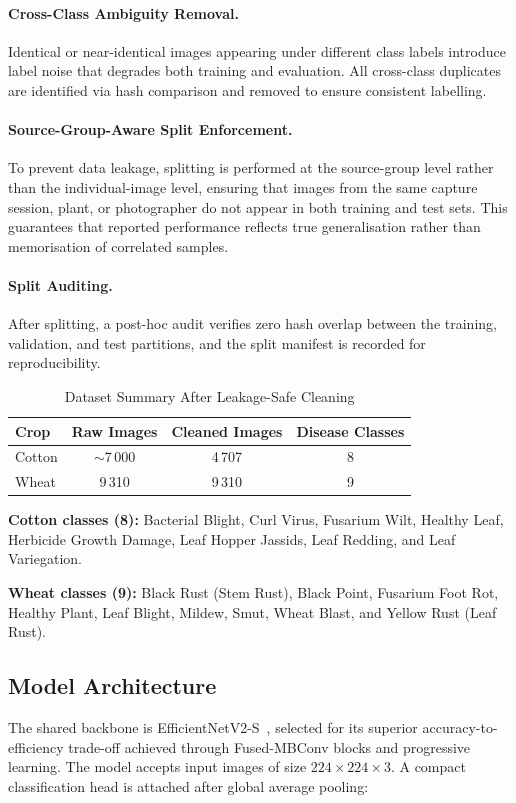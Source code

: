 \documentclass[12pt,a4paper]{report}
\begin{document}
\paragraph{Cross-Class Ambiguity Removal.}
Identical or near-identical images appearing under different class labels introduce label noise that degrades both training and evaluation. All cross-class duplicates are identified via hash comparison and removed to ensure consistent labelling.

\paragraph{Source-Group-Aware Split Enforcement.}
To prevent data leakage, splitting is performed at the source-group level rather than the individual-image level, ensuring that images from the same capture session, plant, or photographer do not appear in both training and test sets. This guarantees that reported performance reflects true generalisation rather than memorisation of correlated samples.

\paragraph{Split Auditing.}
After splitting, a post-hoc audit verifies zero hash overlap between the training, validation, and test partitions, and the split manifest is recorded for reproducibility.

\begin{table}[H]
\centering
\caption{Dataset Summary After Leakage-Safe Cleaning}
\label{tab:dataset-summary}
\begin{tabular}{lccc}
\toprule
Crop & Raw Images & Cleaned Images & Disease Classes \\
\midrule
Cotton & $\sim$7\,000 & 4\,707 & 8 \\
Wheat & 9\,310 & 9\,310 & 9 \\
\bottomrule
\end{tabular}
\end{table}

\textbf{Cotton classes (8):} Bacterial Blight, Curl Virus, Fusarium Wilt, Healthy Leaf, Herbicide Growth Damage, Leaf Hopper Jassids, Leaf Redding, and Leaf Variegation.

\textbf{Wheat classes (9):} Black Rust (Stem Rust), Black Point, Fusarium Foot Rot, Healthy Plant, Leaf Blight, Mildew, Smut, Wheat Blast, and Yellow Rust (Leaf Rust).

\subsection{Model Architecture}
The shared backbone is EfficientNetV2-S~\cite{b1}, selected for its superior accuracy-to-efficiency trade-off achieved through Fused-MBConv blocks and progressive learning. The model accepts input images of size $224 \times 224 \times 3$. A compact classification head is attached after global average pooling:
\end{document}
